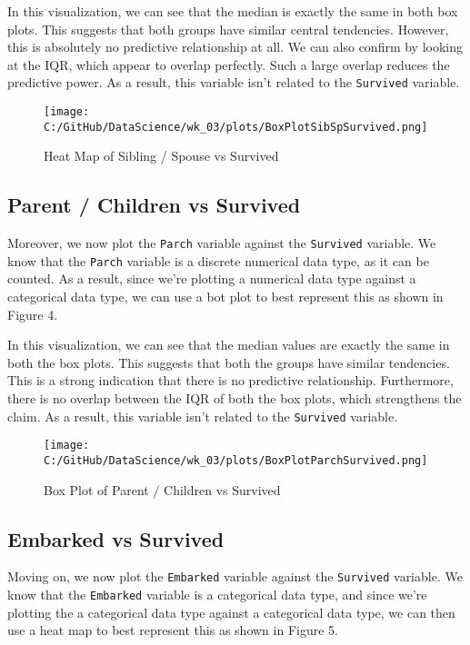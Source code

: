\documentclass[a4paper, twocolumn]{article}
\begin{document}
In this visualization, we can see that the median is exactly the same in both box plots. This suggests that both
groups have similar central tendencies. However, this is absolutely no predictive relationship at all. We can also
confirm by looking at the IQR, which appear to overlap perfectly. Such a large overlap reduces the predictive power.
As a result, this variable isn't related to the \texttt{Survived} variable.

\begin{figure}[h!] 
    \centering
    \noindent
    \texttt{[image: C:/GitHub/DataScience/wk\_03/plots/BoxPlotSibSpSurvived.png]}  
    \caption{Heat Map of Sibling / Spouse vs Survived} 
\end{figure}

\subsection{Parent / Children vs Survived}
Moreover, we now plot the \texttt{Parch} variable against the \texttt{Survived} variable. We know that the 
\texttt{Parch} variable is a discrete numerical data type, as it can be counted. As a result, since we're plotting
a numerical data type against a categorical data type, we can use a bot plot to best represent this as shown in 
Figure 4.

In this visualization, we can see that the median values are exactly the same in both the box plots. This suggests
that both the groups have similar tendencies. This is a strong indication that there is no predictive relationship.
Furthermore, there is no overlap between the IQR of both the box plots, which strengthens the claim. As a result,
this variable isn't related to the \texttt{Survived} variable.

\begin{figure}[h!] 
    \centering
    \noindent
    \texttt{[image: C:/GitHub/DataScience/wk\_03/plots/BoxPlotParchSurvived.png]}  
    \caption{Box Plot of Parent / Children vs Survived} 
\end{figure}


\subsection{Embarked vs Survived}
Moving on, we now plot the \texttt{Embarked} variable against the \texttt{Survived} variable. We know that the 
\texttt{Embarked} variable is a categorical data type, and since we're plotting the a categorical data type against
a categorical data type, we can then use a heat map to best represent this as shown in Figure 5.
\end{document}
